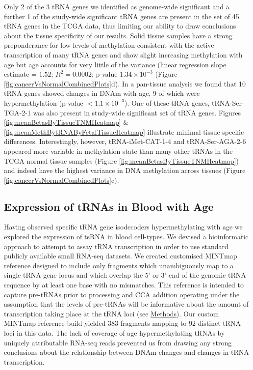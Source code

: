 \documentclass[
]{book}
\begin{document}
Only 2 of the 3 tRNA genes we identified as genome-wide significant and a further 1 of the study-wide significant tRNA genes are present in the set of 45 tRNA genes in the TCGA data, thus limiting our ability to draw conclusions about the tissue specificity of our results.
Solid tissue samples have a strong preponderance for low levels of methylation consistent with the active transcription of many tRNA genes and show slight increasing methylation with age but age accounts for very little of the variance (linear regression slope estimate = \(1.52\); \(R^2= 0.0002\); p-value \(1.34\times10^{-3}\) (Figure \ref{fig:cancerVsNormalCombinedPlots}d).
In a pan-tissue analysis we found that 10 tRNA genes showed changes in DNAm with age, 9 of which were hypermethylation (p-value \(<1.1\times10^{-3}\)).
One of these tRNA genes, tRNA-Ser-TGA-2-1 was also present in study-wide significant set of tRNA genes.
Figures \ref{fig:meanBetasByTissueTNMHeatmap} \& \ref{fig:meanMethBytRNAByFetalTissueHeatmap} illustrate minimal tissue specific differences.
Interestingly, however, tRNA-iMet-CAT-1-4 and tRNA-Ser-AGA-2-6 appeared more variable in methylation state than many other tRNAs in the TCGA normal tissue samples (Figure \ref{fig:meanBetasByTissueTNMHeatmap}) and indeed have the highest variance in DNA methylation across tissues (Figure \ref{fig:cancerVsNormalCombinedPlots}c).

\hypertarget{expression-of-trnas-in-blood-with-age}{%
\subsection{Expression of tRNAs in Blood with Age}\label{expression-of-trnas-in-blood-with-age}}

Having observed specific tRNA gene isodecoders hypermethylating with age we explored the expression of tsRNA in blood cell-types.
We devised a bioinformatic approach to attempt to assay tRNA transcription in order to use standard publicly available small RNA-seq datasets.
We created customised MINTmap \citep{Loher2017} reference designed to include only fragments which unambiguously map to a single tRNA gene locus and which overlap the 5' or 3' end of the genomic tRNA sequence by at least one base with no mismatches.
This reference is intended to capture pre-tRNAs prior to processing and CCA addition operating under the assumption that the levels of pre-tRNAs will be informative about the amount of transcription taking place at the tRNA loci (see \protect\hyperlink{mintmapmethods}{Methods}).
Our custom MINTmap reference build yielded 383 fragments mapping to 92 distinct tRNA loci in this data.
The lack of coverage of age hypermethylating tRNAs by uniquely attributable RNA-seq reads prevented us from drawing any strong conclusions about the relationship between DNAm changes and changes in tRNA transcription.
\end{document}
